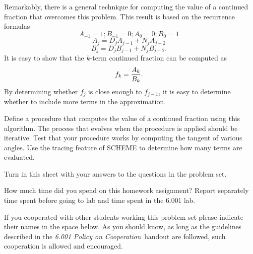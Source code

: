 Remarkably, there is a general technique for computing the value of a
continued fraction that overcomes this problem. This result is based
on the recurrence formulas
\begin{equation} 
A_{-1}=1;B_{-1}=0;A_0=0;B_0=1
\end{equation} 
\begin{equation} 
A_j=D_jA_{j-1}+N_jA_{j-2}
\end{equation} 
\begin{equation} 
B_j=D_jB_{j-1}+N_jB_{j-2}.
\end{equation} 
It is easy to show that the $k$-term continued fraction can be computed as
\begin{equation} 
f_k={{A_k} \over {B_k}}.
\end{equation} 
By determining whether $f_j$ is close enough to $f_{j-1}$, it is easy
to determine whether to include more terms in the approximation.

Define a procedure that computes the value of a continued fraction
using this algorithm. The process that evolves when the procedure is
applied should be iterative. Test that your procedure works by
computing the tangent of various angles. Use the tracing feature of
SCHEME to determine how many terms are evaluated.

\vspace{10ex}


Turn in this sheet with your answers to the questions in the problem set.

\vspace{6ex}

How much time did you spend on this homework assignment? Report separately
time spent before going to lab and time spent in the 6.001 lab.

\vspace{6ex}

If you cooperated with other students working this problem set
please indicate their names in the space below. As you should know,
as long as the guidelines described in the 
{\em 6.001 Policy on Cooperation}\ handout are followed,
such cooperation is allowed and encouraged.





